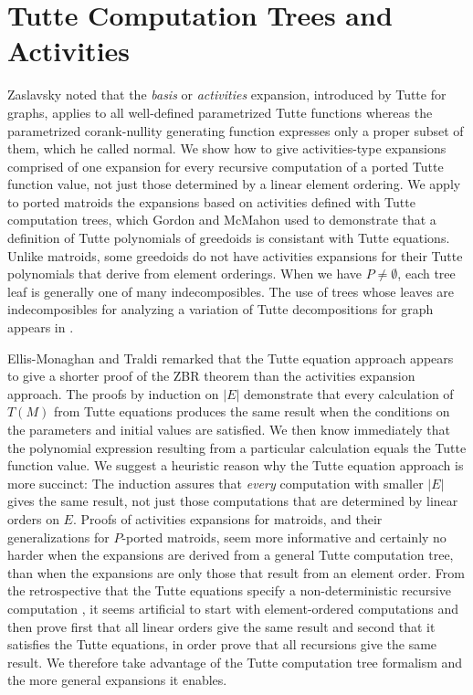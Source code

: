 \documentclass[12pt,leqno]{amsart}
\theoremstyle{remark}
\begin{document}


\section{Tutte Computation Trees and Activities}
\label{Activity}

Zaslavsky\cite{MR93a:05047} noted that the 
\emph{basis} or \emph{activities}
expansion, introduced by Tutte
\cite{TutteDich,TutteGraphBook} for graphs, applies
to all well-defined parametrized 
Tutte functions whereas the 
parametrized corank-nullity generating function
expresses only a proper subset of them, which he called
normal.  We show
how to give activities-type expansions comprised of
one expansion for every recursive computation of
a ported Tutte function value, not just those
determined by a linear element ordering.
We apply to 
ported matroids the expansions based on
activities defined with Tutte computation trees, which 
Gordon and McMahon \cite{GordonMcMachonGreedoid}
used to demonstrate
that a definition of Tutte polynomials
of greedoids is consistant with Tutte equations.
Unlike matroids, some greedoids
do not have activities expansions for their Tutte polynomials
that derive from element orderings\cite{GordonMcMachonGreedoid}.  
When we have $P\neq\emptyset$,
each tree leaf is generally one of many indecomposibles. 
The use of trees whose leaves are indecomposibles 
for analyzing a variation of Tutte decompositions for graph
appears in \cite{NegamiPoly}.

Ellis-Monaghan and 
Traldi \cite{Ellis-Monaghan-Traldi} remarked that the Tutte equation
approach appears to give a shorter proof of the ZBR theorem
than the activities expansion approach. 
The proofs by induction on $|E|$
demonstrate that every calculation of $T(M)$ from Tutte equations
produces the same result when the conditions on the parameters
and initial values are satisfied.  We then know immediately that
the polynomial expression
resulting from
a particular calculation equals the Tutte function value.
We suggest a heuristic reason why
the Tutte equation approach is more succinct:
The induction assures that
\emph{every} computation
with smaller $|E|$ gives the same result, not just those 
computations that are determined by linear orders on $E$.
%
Proofs of activities expansions for matroids, and their generalizations
for $P$-ported matroids, seem more informative and certainly
no harder when the expansions are derived from a general Tutte
computation tree, than when the expansions are only those
that result from an element order.   
From the retrospective that the Tutte equations
specify a non-deterministic recursive computation
\cite{Garey-Johnson}, it seems artificial to start with
element-ordered computations and then prove
first that all linear orders give the same result and 
second that it 
satisfies the Tutte equations, in order prove that 
all recursions give the same result.
We therefore
take advantage of the Tutte computation tree formalism
and the more general expansions it enables.
\end{document}
